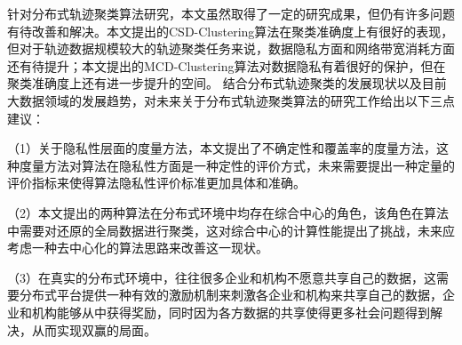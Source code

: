 针对分布式轨迹聚类算法研究，本文虽然取得了一定的研究成果，但仍有许多问题有待改善和解决。本文提出的CSD-Clustering算法在聚类准确度上有很好的表现，但对于轨迹数据规模较大的轨迹聚类任务来说，数据隐私方面和网络带宽消耗方面还有待提升；本文提出的MCD-Clustering算法对数据隐私有着很好的保护，但在聚类准确度上还有进一步提升的空间。
结合分布式轨迹聚类的发展现状以及目前大数据领域的发展趋势，对未来关于分布式轨迹聚类算法的研究工作给出以下三点建议：

（1）关于隐私性层面的度量方法，本文提出了不确定性和覆盖率的度量方法，这种度量方法对算法在隐私性方面是一种定性的评价方式，未来需要提出一种定量的评价指标来使得算法隐私性评价标准更加具体和准确。

（2）本文提出的两种算法在分布式环境中均存在综合中心的角色，该角色在算法中需要对还原的全局数据进行聚类，这对综合中心的计算性能提出了挑战，未来应考虑一种去中心化的算法思路来改善这一现状。

（3）在真实的分布式环境中，往往很多企业和机构不愿意共享自己的数据，这需要分布式平台提供一种有效的激励机制来刺激各企业和机构来共享自己的数据，企业和机构能够从中获得奖励，同时因为各方数据的共享使得更多社会问题得到解决，从而实现双赢的局面。


